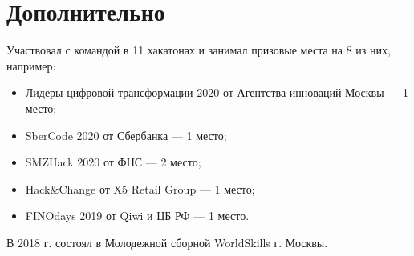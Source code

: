 \section*{Дополнительно}

Участвовал с командой в 11 хакатонах и занимал призовые места на 8 из них, например: 

\vspace{-\topsep}
\begin{itemize}[left=1em] 
    \item Лидеры цифровой трансформации 2020 от Агентства инноваций Москвы --- 1 место;
    \item SberCode 2020 от Сбербанка --- 1 место;
    \item SMZHack 2020 от ФНС --- 2 место;
    \item Hack\&Change от X5 Retail Group --- 1 место;
    \item FINOdays 2019 от Qiwi и ЦБ РФ --- 1 место.
\end{itemize}

В 2018 г. состоял в Молодежной сборной WorldSkills г. Москвы.
